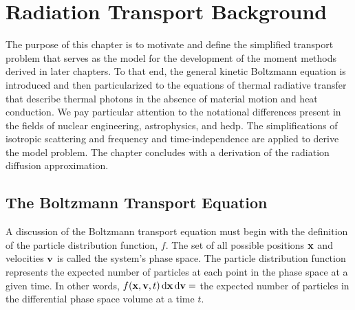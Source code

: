 \documentclass[../doc.tex]{subfiles}
\begin{document}
\chapter{Radiation Transport Background} \label{chap:transport}
The purpose of this chapter is to motivate and define the simplified transport problem that serves as the model for the development of the moment methods derived in later chapters. To that end, the general kinetic Boltzmann equation is introduced and then particularized to the equations of thermal radiative transfer that describe thermal photons in the absence of material motion and heat conduction. We pay particular attention to the notational differences present in the fields of nuclear engineering, astrophysics, and \gls{hedp}. The simplifications of isotropic scattering and frequency and time-independence are applied to derive the model problem. The chapter concludes with a derivation of the radiation diffusion approximation. 

\section{The Boltzmann Transport Equation}
A discussion of the Boltzmann transport equation must begin with the definition of the particle distribution function, $f$. 
The set of all possible positions $\boldsymbol{\mathrm{x}}$ and velocities $\boldsymbol{\mathrm{v}}$ is called the system's phase space. The particle distribution function represents the expected number of particles at each point in the phase space at a given time. In other words, $f(\boldsymbol{\mathrm{x}},\boldsymbol{\mathrm{v}},t) \mathop{}\!\mathrm{d} \boldsymbol{\mathrm{x}} \mathop{}\!\mathrm{d} \boldsymbol{\mathrm{v}} = $ the expected number of particles in the differential phase space volume at a time $t$. 
\end{document}
